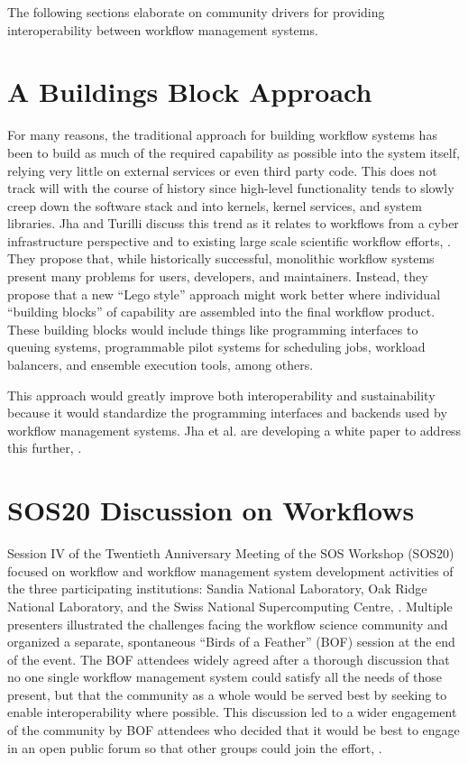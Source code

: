 The following sections elaborate on community drivers for providing
interoperability between workflow management systems.

\section{A Buildings Block Approach}\label{a-buildings-block-approach}

For many reasons, the traditional approach for building workflow systems
has been to build as much of the required capability as possible into
the system itself, relying very little on external services or even
third party code. This does not track will with the course of history
since high-level functionality tends to slowly creep down the
software stack and into kernels, kernel services, and system libraries. Jha and
Turilli discuss this trend as it relates to workflows from a cyber
infrastructure perspective and to existing large scale scientific
workflow efforts, \cite{jha_building_2016}. They propose that, while historically
successful, monolithic workflow systems present many problems for users,
developers, and maintainers. Instead, they propose that a new ``Lego
style'' approach might work better where individual ``building blocks''
of capability are assembled into the final workflow product. These
building blocks would include things like programming interfaces to
queuing systems, programmable pilot systems for scheduling jobs,
workload balancers, and ensemble execution tools, among others.

This approach would greatly improve both interoperability and sustainability
because it would standardize the programming interfaces and backends used by
workflow management systems. Jha et al. are developing a white paper to address
this further, \cite{jha_towards_2016}.

\section{SOS20 Discussion on
Workflows}\label{sos20-discussion-on-workflows}

Session IV of the Twentieth Anniversary Meeting of the SOS Workshop
(SOS20) focused on workflow and workflow management
system development activities of the three participating institutions: Sandia
National Laboratory, Oak Ridge National Laboratory, and the Swiss National Supercomputing Centre, \cite{pack_sos20_2016}. Multiple
presenters illustrated the challenges facing the workflow science community and
organized a separate, spontaneous ``Birds of a Feather'' (BOF) session at
the end of the event. The BOF attendees widely agreed after a thorough
discussion that no one single workflow management system could satisfy
all the needs of those present, but that the community as a whole would
be served best by seeking to enable interoperability where possible. This
discussion led to a wider engagement of the community by BOF attendees
who decided that it would be best to engage in an open public forum so that
other groups could join the effort, \cite{billings_[science-iwg]_2016}.


